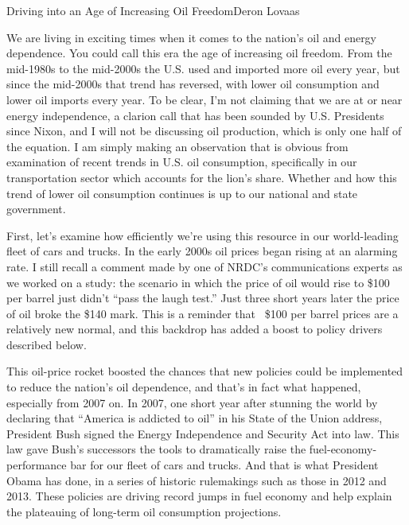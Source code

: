 \documentclass[10pt]{papertex}
\begin{document}
\makeatletter
\renewcommand{\papertex@headDateTime}{
    \raisebox{-5pt}
    {\fontsize{5mm}{6mm}\usefont{T1}{bch}{b}{n}{April 2014}}
    }
\makeatother

\begin{news}{2}{Driving into an Age of Increasing Oil Freedom}{Deron Lovaas}{}{}

We are living in exciting times when it comes to the nation’s oil and energy 
dependence. You could call this era the age of increasing oil freedom. From 
the mid-1980s to the mid-2000s the U.S. used and imported more oil every year, 
but since the mid-2000s that trend has reversed, with lower oil consumption 
and lower oil imports every year. To be clear, I’m not claiming that we are 
at or near energy independence, a clarion call that has been sounded by U.S. 
Presidents since Nixon, and I will not be discussing oil production, which is 
only one half of the equation. I am simply making an observation that is 
obvious from examination of recent trends in U.S. oil consumption, 
specifically in our transportation sector which accounts for the lion’s share. 
Whether and how this trend of lower oil consumption continues is up to our 
national and state government.

First, let’s examine how efficiently we’re using this resource in our 
world-leading fleet of cars and trucks. In the early 2000s oil prices began 
rising at an alarming rate. I still recall a comment made by one of NRDC’s 
communications experts as we worked on a study: the scenario in which the 
price of oil would rise to \$100 per barrel just didn’t “pass the laugh test.” 
Just three short years later the price of oil broke the \$140 mark. This is a 
reminder that ~\$100 per barrel prices are a relatively new normal, and this 
backdrop has added a boost to policy drivers described below.


This oil-price rocket boosted the chances that new policies could be 
implemented to reduce the nation’s oil dependence, and that’s in fact what 
happened, especially from 2007 on. In 2007, one short year after stunning the 
world by declaring that “America is addicted to oil” in his State of the Union 
address, President Bush signed the Energy Independence and Security Act into 
law. This law gave Bush’s successors the tools to dramatically raise the 
fuel-economy-performance bar for our fleet of cars and trucks. And that is 
what President Obama has done, in a series of historic rulemakings such as 
those in 2012 and 2013. These policies are driving record jumps in fuel 
economy and help explain the plateauing of long-term oil consumption 
projections.


\end{news}
\end{document}
